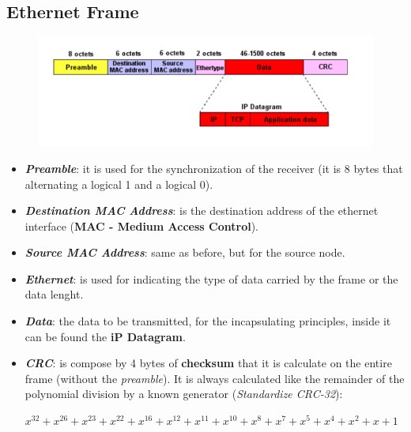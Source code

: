 \subsection{Ethernet Frame}
\begin{figure}[h]
    \centering
    \includegraphics[width=\textwidth]{img/eth_frame}
\end{figure}
\begin{itemize}[nosep]
    \item \textbf{\textit{Preamble}}: it is used for the synchronization of the receiver (it is 8 bytes that alternating a logical 1 and a logical 0).
    \item \textbf{\textit{Destination MAC Address}}: is the destination address of the ethernet interface (\textbf{MAC - Medium Access Control}).
    \item \textbf{\textit{Source MAC Address}}: same as before, but for the source node.
    \item \textbf{\textit{Ethernet}}: is used for indicating the type of data carried by the frame or the data lenght.
    \item \textbf{\textit{Data}}: the data to be transmitted, for the incapsulating principles, inside it can be found the \textbf{iP Datagram}.
    \item \textbf{\textit{CRC}}: is compose by 4 bytes of \textbf{checksum} that it is calculate on the entire frame (without the \textit{preamble}). It is always calculated like the remainder of the polynomial division by a known generator (\textit{Standardize CRC-32}):
    \begin{center}
        $x^{32} + x^{26} + x^{23} + x^{22} + x^{16} + x^{12} + x^{11} + x^{10} + x^8 + x^7 + x^5 + x^4 + x^2 + x + 1$
    \end{center}
\end{itemize}

